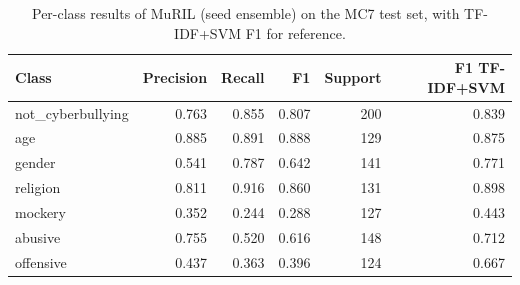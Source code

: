 \begin{table}[t]
\centering
\small
\caption{Per-class results of MuRIL (seed ensemble) on the MC7 test set, with TF-IDF+SVM F1 for reference.}
\label{tab:tab06_per_class_mc7}
\begin{tabular}{lrrrrr}
\toprule
Class & Precision & Recall & F1 & Support & F1 TF-IDF+SVM \\
\midrule
not\_cyberbullying & 0.763 & 0.855 & 0.807 & 200 & 0.839 \\
age & 0.885 & 0.891 & 0.888 & 129 & 0.875 \\
gender & 0.541 & 0.787 & 0.642 & 141 & 0.771 \\
religion & 0.811 & 0.916 & 0.860 & 131 & 0.898 \\
mockery & 0.352 & 0.244 & 0.288 & 127 & 0.443 \\
abusive & 0.755 & 0.520 & 0.616 & 148 & 0.712 \\
offensive & 0.437 & 0.363 & 0.396 & 124 & 0.667 \\
\bottomrule
\end{tabular}
\end{table}
